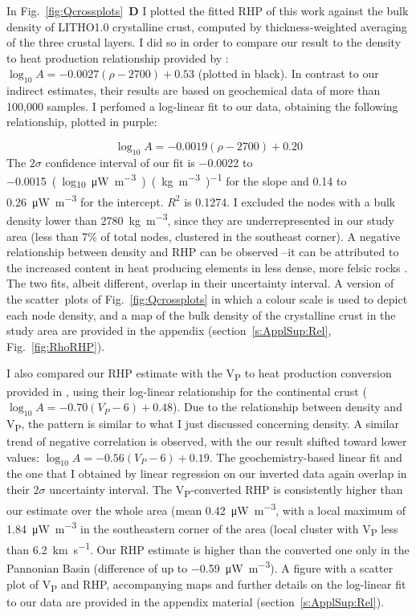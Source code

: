 In Fig.~\ref{fig:Qcrossplots}~\textbf{D} I plotted the fitted RHP of this work against the bulk density of LITHO1.0 \parencite{Pasyanos2014} crystalline crust, computed by thickness-weighted averaging of the three crustal layers.
I did so in order to compare our result to the density to heat production relationship provided by \textcite{Hasterok2017_ign}: $\log_{10} A = -0.0027 (\rho - 2700) + 0.53 $ (plotted in black).
In contrast to our indirect estimates, their results are based on geochemical data of more than {100,000} samples.
I perfomed a log-linear fit to our data, obtaining the following relationship, plotted in purple:

\begin{equation}
	\label{eq:RHP_RHO_fit}
	\log_{10} A = -0.0019 (\rho - 2700) + 0.20
\end{equation}
The $2\sigma$ confidence interval of our fit is \num{-0.0022} to \SI{-0.0015}{(log_{10} \micro \watt \per \cubic \metre)(\kilo \gram \per \cubic \metre)^{-1}} for the slope and \num{0.14} to \SI{0.26}{\micro \watt \per \cubic \metre} for the intercept.
$R^2$ is \num{0.1274}.
I excluded the nodes with a bulk density lower than 2780~\si{\kilo \gram \per \cubic \metre}, since they are underrepresented in our study area (less than 7\% of total nodes, clustered in the southeast corner).
A negative relationship between density and RHP can be observed --it can be attributed to the increased content in heat producing elements in less dense, more felsic rocks \parencite{Hasterok2017_ign}.
The two fits, albeit different, overlap in their uncertainty interval.
A version of the scatter~plots of Fig.~\ref{fig:Qcrossplots} in which a colour scale is used to depict each node density, and a map of the bulk density of the crystalline crust in the study area are provided in the appendix (section~\ref{s:ApplSup:Rel}, Fig.~\ref{fig:RhoRHP}).

I also compared our RHP estimate with the V\textsubscript{P} to heat production conversion provided in \textcite{Hasterok2017_ign}, using their log-linear relationship for the continental crust ($\log_{10} A = -0.70 (V_{P} - 6) + 0.48$).
Due to the relationship between density and V\textsubscript{P}, the pattern is similar to what I just discussed concerning density. A similar trend of negative correlation is observed, with the our result shifted toward lower values: $\log_{10} A = -0.56 (V_{P} - 6) + 0.19$.
The geochemistry-based linear fit and the one that I obtained by linear regression on our inverted data again overlap in their $2\sigma$ uncertainty interval.
The V\textsubscript{P}-converted RHP is consistently higher than our estimate over the whole area (mean \SI[retain-explicit-plus]{+0.42}{\micro \watt \per \cubic \metre}, with a local maximum of \SI[retain-explicit-plus]{+1.84}{\micro \watt \per \cubic \metre} in the southeastern corner of the area (local cluster with V\textsubscript{P} less than \SI{6.2}{\kilo \metre \per \second}.
Our RHP estimate is higher than the converted one only in the Pannonian Basin (difference of up to \SI{-0.59}{\micro \watt \per \cubic \metre}).
A figure with a scatter plot of V\textsubscript{P} and RHP, accompanying maps and further details on the log-linear fit to our data are provided in the appendix material (section~\ref{s:ApplSup:Rel}).


